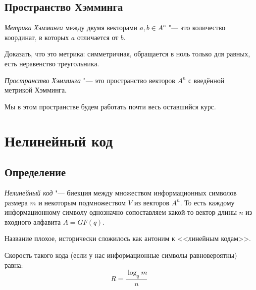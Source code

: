 \subsection{Пространство Хэмминга}
\begin{Def}
	\textit{Метрика Хэмминга} между двумя векторами $a, b \in A^n$ "--- это количество
	координат, в которых $a$ отличается от $b$.
\end{Def}
\begin{Exercise}
	Доказать, что это метрика: симметричная, обращается в ноль только для равных, есть неравенство треугольника.
\end{Exercise}

\begin{Def}
	\textit{Пространство Хэмминга} "--- это пространство векторов $A^n$ с введённой метрикой Хэмминга.
\end{Def}
Мы в этом пространстве будем работать почти весь оставшийся курс.

\section{Нелинейный код}
\subsection{Определение}
\begin{Def}
	\textit{Нелинейный код} "--- биекция между множеством информационных символов размера $m$
	и некоторым подмножеством $V$ из векторов $A^n$.
	То есть каждому информационному символу однозначно сопоставляем какой-то вектор длины $n$
	из входного алфавита $A=GF(q)$.
\end{Def}
\begin{Rem}
	Название плохое, исторически сложилось как антоним к <<линейным кодам>>.
\end{Rem}
\begin{Rem}
	Скорость такого кода (если у нас информационные символы равновероятны) равна:
	\[
		R = \frac{\log_q m}{n}
	\]
\end{Rem}

